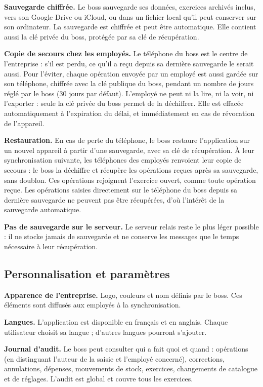 \documentclass[11pt,a4paper]{article}
\newcommand{\fonc}[2]{\textbf{#1.} #2\par\vspace{0.2em}}
\begin{document}
	\fonc{Sauvegarde chiffrée}{Le boss sauvegarde ses données, exercices archivés inclus, vers son Google Drive ou iCloud, ou dans un fichier local qu'il peut conserver sur son ordinateur. La sauvegarde est chiffrée et peut être automatique. Elle contient aussi la clé privée du boss, protégée par sa clé de récupération.}

	\fonc{Copie de secours chez les employés}{Le téléphone du boss est le centre de l'entreprise : s'il est perdu, ce qu'il a reçu depuis sa dernière sauvegarde le serait aussi. Pour l'éviter, chaque opération envoyée par un employé est aussi gardée sur son téléphone, chiffrée avec la clé publique du boss, pendant un nombre de jours réglé par le boss (30 jours par défaut). L'employé ne peut ni la lire, ni la voir, ni l'exporter : seule la clé privée du boss permet de la déchiffrer. Elle est effacée automatiquement à l'expiration du délai, et immédiatement en cas de révocation de l'appareil.}

	\fonc{Restauration}{En cas de perte du téléphone, le boss restaure l'application sur un nouvel appareil à partir d'une sauvegarde, avec sa clé de récupération. À leur synchronisation suivante, les téléphones des employés renvoient leur copie de secours : le boss la déchiffre et récupère les opérations reçues après sa sauvegarde, sans doublon. Ces opérations rejoignent l'exercice ouvert, comme toute opération reçue. Les opérations saisies directement sur le téléphone du boss depuis sa dernière sauvegarde ne peuvent pas être récupérées, d'où l'intérêt de la sauvegarde automatique.}

	\fonc{Pas de sauvegarde sur le serveur}{Le serveur relais reste le plus léger possible : il ne stocke jamais de sauvegarde et ne conserve les messages que le temps nécessaire à leur récupération.}

	\subsection{Personnalisation et paramètres}

	\fonc{Apparence de l'entreprise}{Logo, couleurs et nom définis par le boss. Ces éléments sont diffusés aux employés à la synchronisation.}

	\fonc{Langues}{L'application est disponible en français et en anglais. Chaque utilisateur choisit sa langue ; d'autres langues pourront s'ajouter.}

	\fonc{Journal d'audit}{Le boss peut consulter qui a fait quoi et quand : opérations (en distinguant l'auteur de la saisie et l'employé concerné), corrections, annulations, dépenses, mouvements de stock, exercices, changements de catalogue et de réglages. L'audit est global et couvre tous les exercices.}
\end{document}
